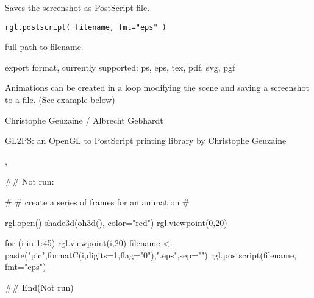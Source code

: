 \begin{Description}\relax
Saves the screenshot as PostScript file.
\end{Description}
\begin{Usage}
\begin{verbatim}
rgl.postscript( filename, fmt="eps" )
\end{verbatim}
\end{Usage}
\begin{Arguments}
\begin{ldescription}
\item[\code{filename}] full path to filename.
\item[\code{fmt}] export format, currently supported: ps, eps, tex, pdf, svg, pgf 
\end{ldescription}
\end{Arguments}
\begin{Details}\relax
Animations can be created in a loop modifying the scene and saving 
a screenshot to a file. (See example below)
\end{Details}
\begin{Author}\relax
Christophe Geuzaine / Albrecht Gebhardt
\end{Author}
\begin{References}\relax
GL2PS: an OpenGL to PostScript printing library by Christophe Geuzaine
\end{References}
\begin{SeeAlso}\relax
{}, 
\end{SeeAlso}
\begin{Examples}
\begin{ExampleCode}

## Not run: 

#
# create a series of frames for an animation
#

rgl.open()
shade3d(oh3d(), color="red")
rgl.viewpoint(0,20)

for (i in 1:45) {
  rgl.viewpoint(i,20)
  filename <- paste("pic",formatC(i,digits=1,flag="0"),".eps",sep="") 
  rgl.postscript(filename, fmt="eps")
}

## End(Not run)

\end{ExampleCode}
\end{Examples}


